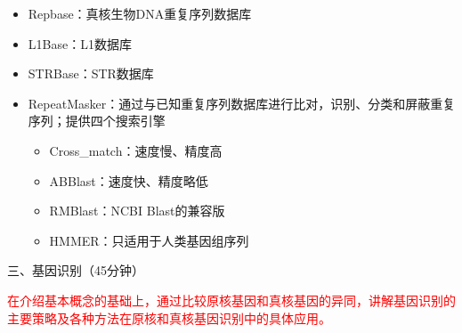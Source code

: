 \documentclass{TIJMUjiaoanLL}
\begin{document}
\begin{enumerate}
\begin{itemize}
      \item Repbase：真核生物DNA重复序列数据库
      \item L1Base：L1数据库
      \item STRBase：STR数据库
      \item RepeatMasker：通过与已知重复序列数据库进行比对，识别、分类和屏蔽重复序列；提供四个搜索引擎
	\begin{itemize}
	  \item Cross\_match：速度慢、精度高
	  \item ABBlast：速度快、精度略低
	  \item RMBlast：NCBI Blast的兼容版
	  \item HMMER：只适用于人类基因组序列
	\end{itemize}
    \end{itemize}
\end{enumerate}


\otherTail
\newpage
\otherHeader


\noindent
三、基因识别（45分钟）

\textcolor{red}{在介绍基本概念的基础上，通过比较原核基因和真核基因的异同，讲解基因识别的主要策略及各种方法在原核和真核基因识别中的具体应用。}
\end{document}

